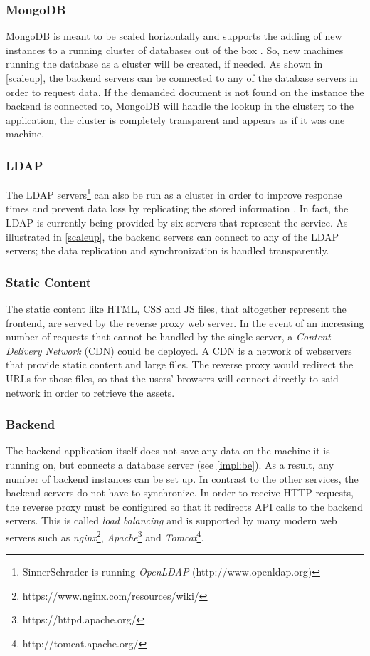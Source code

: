 \newpage
\subsubsection{MongoDB}
MongoDB is meant to be scaled horizontally and supports the adding of new instances to a running cluster of databases out of the box \cite[p. 19]{MongoGuide}. So, new machines running the database as a cluster will be created, if needed. As shown in \ref{scaleup}, the backend servers can be connected to any of the database servers in order to request data. If the demanded document is not found on the instance the backend is connected to, MongoDB will handle the lookup in the cluster; to the application, the cluster is completely transparent and appears as if it was one machine.

\subsubsection{LDAP}
The LDAP servers\footnote{SinnerSchrader is running \textit{OpenLDAP} (http://www.openldap.org)} can also be run as a cluster in order to improve response times and prevent data loss by replicating the stored information \cite{ldapscale}. In fact, the LDAP is currently being provided by six servers that represent the service. As illustrated in \ref{scaleup}, the backend servers can connect to any of the LDAP servers; the data replication and synchronization is handled transparently.

\subsubsection{Static Content}
The static content like HTML, CSS and JS files, that altogether represent the frontend, are
served by the reverse proxy web server. In the event of an increasing number of requests that cannot be handled by the single server, a \textit{Content Delivery Network} (CDN) could be deployed. A CDN is a network of webservers that provide static content and large files. The reverse proxy would redirect the URLs for those files, so that the users' browsers will connect directly to said network in order to retrieve the assets.

\subsubsection{Backend}
The backend application itself does not save any data on the machine it is running on, but connects a database server (see \ref{impl:be}). As a result, any number of backend instances can be set up. In contrast to the other services, the backend servers do not have to synchronize. In order to receive HTTP requests, the reverse proxy must be configured so that it redirects API calls to the backend servers. This is called \textit{load balancing} and is supported by many modern web servers such as \textit{nginx}\footnote{https://www.nginx.com/resources/wiki/}, \textit{Apache}\footnote{https://httpd.apache.org/} and \textit{Tomcat}\footnote{http://tomcat.apache.org/}.

